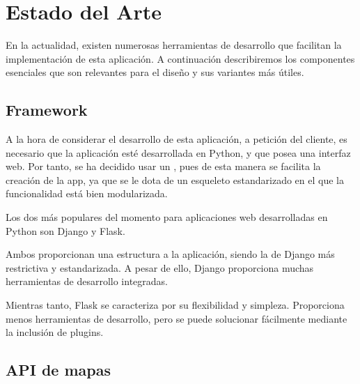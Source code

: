   
\chapter{Estado del Arte\label{CAP:ESTADOARTE}}
  En la actualidad, existen numerosas herramientas de desarrollo que facilitan la implementación de esta aplicación. A continuación describiremos los componentes esenciales que son relevantes para el diseño y sus variantes más útiles.


  \section{Framework}
    A la hora de considerar el desarrollo de esta aplicación, a petición del cliente, es necesario que la aplicación esté desarrollada en Python, y que posea una interfaz web.
    Por tanto, se ha decidido usar un , pues de esta manera se facilita la creación de la app, ya que se le dota de un esqueleto estandarizado en el que la funcionalidad está bien modularizada.
    
    Los dos  más populares del momento para aplicaciones web desarrolladas en Python son Django\cite{django} y Flask\cite{flask}.

    Ambos proporcionan una estructura a la aplicación, siendo la de Django más restrictiva y estandarizada. A pesar de ello, Django proporciona muchas herramientas de desarrollo integradas.
    
    Mientras tanto, Flask se caracteriza por su flexibilidad y simpleza. Proporciona menos herramientas de desarrollo, pero se puede solucionar fácilmente mediante la inclusión de plugins.
    
  
  \section{API de mapas}
  
